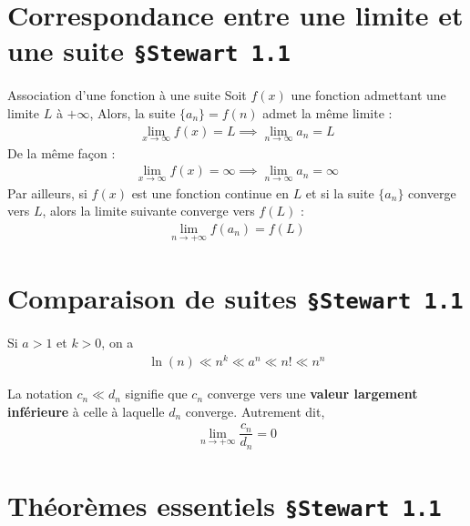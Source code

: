 \documentclass[16pt]{report}
\begin{document}
\begin{multicols*}{2}
    \section{Correspondance entre une limite et une suite \texttt{\S Stewart 1.1}}
    \begin{Theorem}{Association d'une fonction à une suite}{}
        Soit $f\left(x\right)$ une fonction admettant une limite $L$ à 
        $\text{+}\infty$, Alors, la suite 
        $\{a_n\} = f\left(n\right)$ admet la même limite : 
        \begin{align*}
          \lim\limits_{x\to\infty}f(x) = L \implies \lim\limits_{n\to\infty}a_n = L
        \end{align*}
        De la même façon :
        \begin{align*}
          \lim\limits_{x\to\infty}f(x) = \infty \implies \lim\limits_{n\to\infty}a_n = \infty
        \end{align*}
        Par ailleurs, si $f\left(x\right)$ est une fonction continue en 
        $L$ et si la suite $\{a_n\}$
        converge vers $L$, alors la limite suivante converge vers $f\left(L\right)$ :
        \begin{align*}
                    \lim\limits_{n\to+\infty}f(a_n)  = f(L) 
        \end{align*}
    \end{Theorem}


    \section{Comparaison de suites \texttt{\S Stewart 1.1}}
    \begin{Theorem}{}{}
        Si $a > 1$ et $k > 0$, on a 
        \begin{align*}
            \ln(n) \ll n^k \ll a^n \ll n! \ll n^n
        \end{align*}
    \end{Theorem}

    \begin{note}{}{}
        La notation $c_n \ll d_n$ signifie que $c_n$ converge vers une 
        \textbf{valeur largement inférieure}
        à celle à laquelle $d_n$ converge. Autrement dit, 
        \begin{align*}
                \lim\limits_{n\to+\infty }\dfrac{c_n}{d_n} = 0
        \end{align*}
    \end{note}


    \section{Théorèmes essentiels \texttt{\S Stewart 1.1}}


\end{multicols*}
\end{document}
